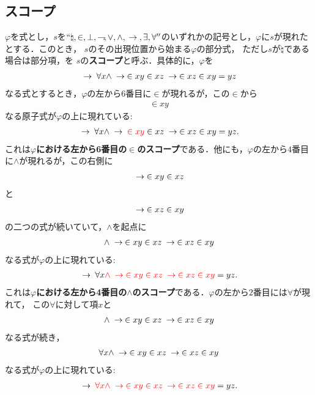 \subsection{スコープ}
	$\varphi$を式とし，$s$を$``\natural,\in,\bot,\negation,\vee,\wedge,
	\rarrow,\exists,\forall''$のいずれかの記号とし，$\varphi$に$s$が現れたとする．このとき，
	$s$のその出現位置から始まる$\varphi$の部分式，
	ただし$s$が$\natural$である場合は部分項，を
	$s$の{\bf スコープ}と呼ぶ．具体的に，$\varphi$を
	\begin{align}
		\rarrow \forall x \wedge \rarrow \in xy \in xz \rarrow \in xz \in xy = yz
	\end{align}
	なる式とするとき，$\varphi$の左から$6$番目に$\in$が現れるが，この$\in$から
	\begin{align}
		\in xy
	\end{align}
	なる原子式が$\varphi$の上に現れている:
	\begin{align}
		\rarrow \forall x \wedge \rarrow \textcolor{red}{\in xy} \in xz \rarrow \in xz \in xy = yz.
	\end{align}
	これは{\bf $\varphi$における左から6番目の$\in$のスコープ}である．他にも，$\varphi$の左から$4$番目に$\wedge$が現れるが，この右側に
	\begin{align}
		\rarrow \in xy \in xz
	\end{align}
	と
	\begin{align}
		\rarrow \in xz \in xy
	\end{align}
	の二つの式が続いていて，$\wedge$を起点に
	\begin{align}
		\wedge \rarrow \in xy \in xz \rarrow \in xz \in xy
	\end{align}
	なる式が$\varphi$の上に現れている:
	\begin{align}
		\rarrow \forall x \textcolor{red}{\wedge \rarrow \in xy \in xz \rarrow \in xz \in xy} = yz.
	\end{align}
	これは{\bf $\varphi$における左から4番目の$\wedge$のスコープ}である．$\varphi$の左から$2$番目には$\forall$が現れて，
	この$\forall$に対して項$x$と
	\begin{align}
		\wedge \rarrow \in xy \in xz \rarrow \in xz \in xy
	\end{align}
	なる式が続き，
	\begin{align}
		\forall x \wedge \rarrow \in xy \in xz \rarrow \in xz \in xy
	\end{align}
	なる式が$\varphi$の上に現れている:
	\begin{align}
		\rarrow \textcolor{red}{\forall x \wedge \rarrow \in xy \in xz \rarrow \in xz \in xy} = yz.
	\end{align}
	
